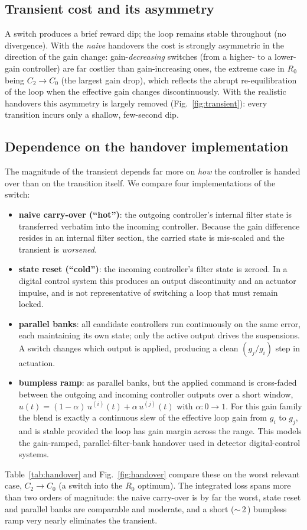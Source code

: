 \documentclass[11pt,a4paper]{article}
\newcommand{\SI}[2]{#1\,\text{#2}}
\newcommand{\Cz}{C_{0}}
\newcommand{\Ct}{C_{2}}
\begin{document}
\subsection{Transient cost and its asymmetry}\label{sec:sw-cost}
A switch produces a brief reward dip; the loop remains stable throughout (no
divergence). With the \emph{naive} handovers the cost is strongly asymmetric in
the direction of the gain change: gain-\emph{decreasing} switches (from a higher-
to a lower-gain controller) are far costlier than gain-increasing ones, the
extreme case in $R_0$ being $\Ct\!\to\!\Cz$ (the largest gain drop), which
reflects the abrupt re-equilibration of the loop when the effective gain changes
discontinuously. With the realistic handovers this asymmetry is largely removed
(Fig.~\ref{fig:transient}): every transition incurs only a shallow, few-second
dip.

\subsection{Dependence on the handover implementation}\label{sec:sw-handover}
The magnitude of the transient depends far more on \emph{how} the controller is
handed over than on the transition itself. We compare four implementations of
the switch:
\begin{itemize}
  \item \textbf{naive carry-over (``hot'')}: the outgoing controller's internal
  filter state is transferred verbatim into the incoming controller. Because the
  gain difference resides in an internal filter section, the carried state is
  mis-scaled and the transient is \emph{worsened}.
  \item \textbf{state reset (``cold'')}: the incoming controller's filter state
  is zeroed. In a digital control system this produces an output discontinuity
  and an actuator impulse, and is not representative of switching a loop that
  must remain locked.
  \item \textbf{parallel banks}: all candidate controllers run continuously on
  the same error, each maintaining its own state; only the active output drives
  the suspensions. A switch changes which output is applied, producing a clean
  $(g_j/g_i)$ step in actuation.
  \item \textbf{bumpless ramp}: as parallel banks, but the applied command is
  cross-faded between the outgoing and incoming controller outputs over a short
  window, $u(t) = (1-\alpha)\,u^{(i)}(t) + \alpha\,u^{(j)}(t)$ with $\alpha:
  0\!\to\!1$. For this gain family the blend is exactly a continuous slew of the
  effective loop gain from $g_i$ to $g_j$, and is stable provided the loop has
  gain margin across the range. This models the gain-ramped, parallel-filter-bank
  handover used in detector digital-control systems.
\end{itemize}
Table~\ref{tab:handover} and Fig.~\ref{fig:handover} compare these on the worst
relevant case, $\Ct\!\to\!\Cz$ (a switch into the $R_0$ optimum). The integrated
loss spans more than two orders of magnitude: the naive carry-over is by far the
worst, state reset and parallel banks are comparable and moderate, and a short
($\sim$\,\SI{2}{s}) bumpless ramp very nearly eliminates the transient.
\end{document}
